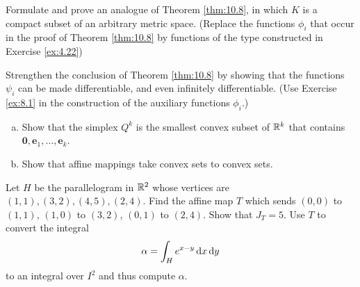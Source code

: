 \begin{myexercise}    
    \label{ex:10.5}
    Formulate and prove an analogue of Theorem \ref{thm:10.8}, 
    in which $K$ is a compact subset of an arbitrary metric space. 
    (Replace the functions $\phi_i$ that occur in the
    proof of Theorem \ref{thm:10.8} 
    by functions of the type constructed in Exercise \ref{ex:4.22})
\end{myexercise}


\begin{myexercise}    
    \label{ex:10.6}
    Strengthen the conclusion of Theorem \ref{thm:10.8} by showing that the functions $\psi_i$ can be made differentiable, and even infinitely differentiable. 
    (Use Exercise \ref{ex:8.1} in the construction of the auxiliary functions $\phi_i$.)
\end{myexercise}


\begin{myexercise}    
    \label{ex:10.7}
    \begin{enumerate}[(a)]
        \item Show that the simplex $Q^k$ is the smallest convex subset of ${\protect\mathbb R}^k$ that contains $\mathbf{0},\mathbf{e}_1,\dots,\mathbf{e}_k$.
        \item Show that affine mappings take convex sets to convex sets.
    \end{enumerate}
\end{myexercise}


\begin{myexercise}    
    \label{ex:10.8}
    Let $H$ be the parallelogram in ${\protect\mathbb R}^2$ whose vertices are $(1, 1), (3, 2), (4, 5), (2, 4)$.
    Find the affine map $T$ which sends $(0, 0)$ to $(1, 1)$, $(1, 0)$ to $(3, 2)$, $(0, 1)$ to $(2, 4)$.
    Show that $J_T = 5$. 
    Use $T$ to convert the integral
    \begin{equation*}
        \alpha = \int_H e^{x-y} \d x \d y
    \end{equation*}
    to an integral over $I^2$ and thus compute $\alpha$.
\end{myexercise}


